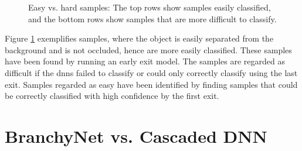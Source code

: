\begin{figure}
	\captionsetup[subfigure]{justification=centering}
	\centering
	\hfill
	\caption[Easy vs. hard samples]{Easy vs. hard samples: The top rows show samples easily classified, and the bottom rows show samples that are more difficult to classify. }
	\label{fig:hardvseasy}
\end{figure}

Figure \ref{fig:hardvseasy} exemplifies samples, where the object is easily separated from the background and is not occluded, hence are more easily classified. These samples have been found by running an early exit model. The samples are regarded as difficult if the \gls{dnn}s failed to classify or could only correctly classify using the last exit. Samples regarded as easy have been identified by finding samples that could be correctly classified with high confidence by the first exit.

\section{BranchyNet vs. Cascaded DNN} \label{sec:ee-branchy-vs-cascaded}

